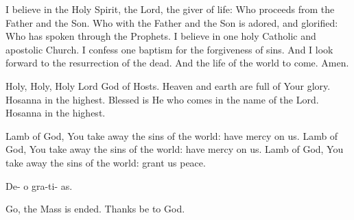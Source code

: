 \documentclass[11pt]{article} %
\begin{document}
I believe in the Holy Spirit, the Lord, the giver of life:  Who proceeds from the Father and the Son.  Who with the Father and the Son is adored, and glorified:  Who has spoken through the Prophets.  I believe in one holy Catholic and apostolic Church.  I confess one baptism for the forgiveness of sins.  And I look forward to the resurrection of the dead.  And the life of the world to come.  Amen.

\vskip20pt

Holy, Holy, Holy Lord God of Hosts.  Heaven and earth are full of Your glory.  Hosanna in the highest.  Blessed is He who comes in the name of the Lord.  Hosanna in the highest.

\vskip20pt

Lamb of God, You take away the sins of the world: have mercy on us.  Lamb of God, You take away the sins of the world: have mercy on us.  Lamb of God, You take away the sins of the world: grant us peace.

\vskip20pt

\hspace{8.3pt} De-\hspace{15.2pt} o\hspace{36.5pt} gra-\hspace{0.3pt}ti-\hspace{0.7pt} as.

Go, the Mass is ended.  Thanks be to God.
\end{document}
